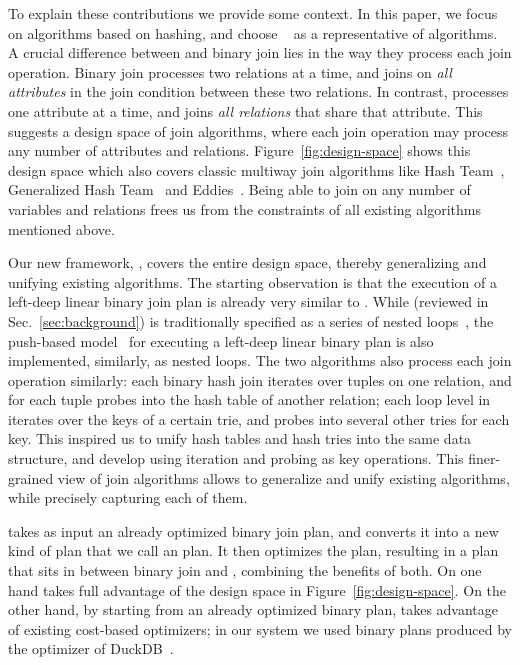 To explain these contributions we provide some context.
%
In this paper, we focus on algorithms based on hashing,
  and choose \GJ~\cite{DBLP:journals/sigmod/NgoRR13} as a representative of \WCOJ algorithms.
A crucial difference between \GJ and binary join lies 
  in the way they process each join operation. 
Binary join processes two relations at a time, 
  and joins on \emph{all attributes} 
  in the join condition between these two relations. 
In contrast, \GJ processes one attribute at a time, 
  and joins \emph{all relations} that share that attribute.
This suggests a design space of join algorithms, 
  where each join operation may process any 
  number of attributes and relations.
Figure~\ref{fig:design-space} shows this design space
  which also covers classic multiway join algorithms 
  like Hash Team~\cite{DBLP:conf/vldb/GraefeBC98}, 
  Generalized Hash Team~\cite{DBLP:conf/vldb/KemperKW99}
  and Eddies~\cite{DBLP:conf/sigmod/HellersteinA00}.
Being able to join on any number of variables and relations
  frees us from the constraints of all existing algorithms 
  mentioned above. 

Our new framework, \FJ,
  covers the entire design space, 
  thereby generalizing and unifying existing algorithms.
The starting observation is that the execution of a left-deep linear 
  binary join plan is already very similar to \GJ.
While \GJ (reviewed in Sec.~\ref{sec:background}) is traditionally specified as a series of nested loops~\cite{DBLP:journals/sigmod/NgoRR13},
  the push-based model~\cite{DBLP:journals/pvldb/Neumann11,DBLP:journals/pvldb/KerstenLKNPB18} for executing a left-deep linear binary plan
  is also implemented, similarly, as nested loops.
The two algorithms also process each join operation similarly:
  each binary hash join iterates over tuples on one relation, 
  and for each tuple probes into the hash table of another relation;
  each loop level in \GJ iterates over the keys of a certain trie,
  and probes into several other tries for each key.
This inspired us to unify hash tables and hash tries into the same data structure, 
  and develop \FJ using iteration and probing as key operations.
This finer-grained view of join algorithms allows \FJ
  to generalize and unify existing algorithms,
  while precisely capturing each of them.

  \FJ takes as input an already optimized binary join plan, and
  converts it into a new kind of plan that we call an \FJ plan.  It
  then optimizes the \FJ plan, resulting in a plan that sits in
  between binary join and \GJ, combining the benefits of both.  On one
  hand \FJ takes full advantage of the design space in
  Figure~\ref{fig:design-space}.  On the other hand, by starting from
  an already optimized binary plan, \FJ takes advantage of existing
  cost-based optimizers; in our system we used binary plans produced by
  the optimizer of DuckDB~\cite{DBLP:conf/cidr/RaasveldtM20,DBLP:conf/vldb/Raasveldt22}.

